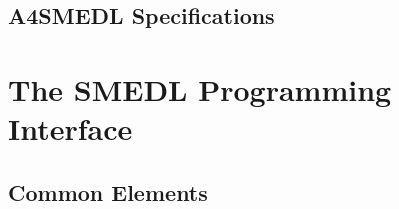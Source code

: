 \documentclass[paper=letter]{scrreport}
\begin{document}



\chapter{A4SMEDL Specifications}
\label{ch:a4smedl}





\part{The SMEDL Programming Interface}
\label{part:api}


\chapter{Common Elements}
\end{document}
